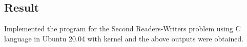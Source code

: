 \subsection{Result}
Implemented the program for the Second Readers-Writers problem using C language in Ubuntu 20.04 with kernel and the above outputs were obtained.

